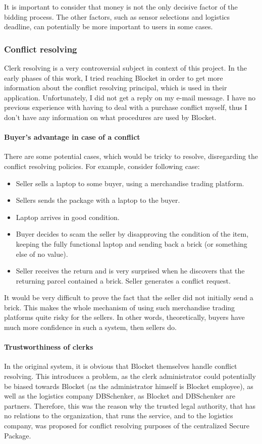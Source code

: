 It is important to consider that money is not the only decisive factor of the bidding process. The other factors, such as sensor selections and logistics deadline, can potentially be more important to users in some cases.

\subsubsection{Conflict resolving}
Clerk resolving is a very controversial subject in context of this project. In the early phases of this work, I tried reaching Blocket in order to get more information about the conflict resolving principal, which is used in their application. Unfortunately, I did not get a reply on my e-mail message. I have no previous experience with having to deal with a purchase conflict myself, thus I don't have any information on what procedures are used by Blocket. 

\paragraph{Buyer's advantage in case of a conflict}
There are some potential cases, which would be tricky to resolve, disregarding the conflict resolving policies. For example, consider following case:

\begin{itemize}
\item Seller sells a laptop to some buyer, using a merchandise trading platform.
\item Sellers sends the package with a laptop to the buyer.
\item Laptop arrives in good condition.
\item Buyer decides to scam the seller by disapproving the condition of the item, keeping the fully functional laptop and sending back a brick (or something else of no value).
\item Seller receives the return and is very surprised when he discovers that the returning parcel contained a brick. Seller generates a conflict request.
\end{itemize}

It would be very difficult to prove the fact that the seller did not initially send a brick. This makes the whole mechanism of using such merchandise trading platforms quite risky for the sellers. In other words, theoretically, buyers have much more confidence in such a system, then sellers do.

\paragraph{Trustworthiness of clerks}
In the original system, it is obvious that Blocket themselves handle conflict resolving. This introduces a problem, as the clerk administrator could potentially be biased towards Blocket (as the administrator himself is Blocket employee), as well as the logistics company DBSchenker, as Blocket and DBSchenker are partners. Therefore, this was the reason why the trusted legal authority, that has no relations to the organization, that runs the service, and to the logistics company, was proposed for conflict resolving purposes of the centralized Secure Package.


